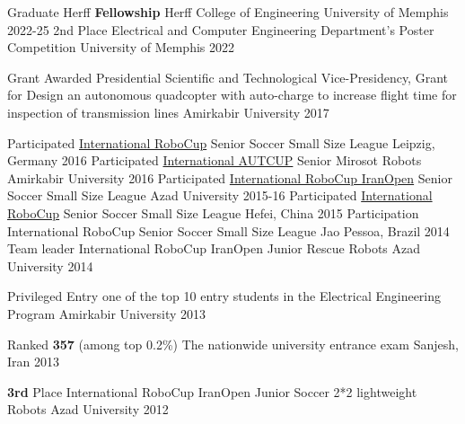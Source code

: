 


\begin{cvhonors}

  \cvhonor
  {Graduate Herff \textbf{Fellowship}}
  {Herff College of Engineering}
  {University of Memphis}
  {2022-25}
  \cvhonor
    {2nd Place}
        {Electrical and Computer Engineering Department's Poster Competition}
    {University of Memphis}
	{2022}

  \cvhonor
    {Grant Awarded} %
    {Presidential Scientific and Technological Vice-Presidency, Grant for Design an autonomous quadcopter with auto-charge to increase flight time for inspection of transmission lines} %
    {Amirkabir University} %
    {2017} %

      \cvhonor
    {Participated}
    {\href{https://en.wikipedia.org/wiki/RoboCup}{International RoboCup} Senior Soccer Small Size League}
    {Leipzig, Germany}
	{2016}
  \cvhonor
      {Participated}
      {\href{http://autcup.aut.ac.ir/2018/visitorpages/default.aspx?itemid=3}{International AUTCUP} Senior Mirosot Robots}
      {Amirkabir University}
	   {2016}
  \cvhonor
    {Participated}
    {\href{https://en.wikipedia.org/wiki/IranOpen}{International RoboCup IranOpen} Senior Soccer Small Size League}
    { Azad University}
	{2015-16}
  \cvhonor
    {Participated}
    {\href{https://en.wikipedia.org/wiki/RoboCup}{International RoboCup} Senior Soccer Small Size League}
    {Hefei, China}
	{2015}
  \cvhonor
    {Participation}
    {International RoboCup Senior Soccer Small Size League}
    {Jao Pessoa, Brazil}
	{2014}
  \cvhonor
    {Team leader}
    {International RoboCup IranOpen Junior Rescue Robots}
    { Azad University}
	{2014}

\cvhonor
 {Privileged Entry}
 {one of the top 10 entry students in the Electrical Engineering Program}
 {Amirkabir University}
 {2013}

\cvhonor
 {Ranked \textbf{357} (among top 0.2\%)}
 {The nationwide university entrance exam}
 {Sanjesh, Iran}
 {2013}
 
  \cvhonor
      {\textbf{3rd} Place}
      {International RoboCup IranOpen Junior Soccer 2*2 lightweight Robots}
      { Azad University}
        {2012}
        

\end{cvhonors}
